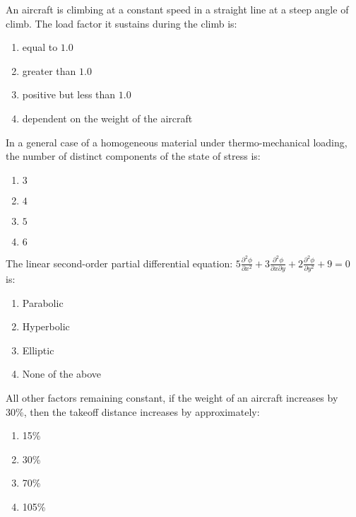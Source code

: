 \item An aircraft is climbing at a constant speed in a straight line at a steep angle of climb. The load factor it sustains during the climb is:

\begin{multicols}{2}
\begin{enumerate}
    \item equal to $1.0$
    \item greater than $1.0$
    \item positive but less than $1.0$
    \item dependent on the weight of the aircraft
\end{enumerate}
\end{multicols}

\item In a general case of a homogeneous material under thermo-mechanical loading, the number of distinct components of the state of stress is:
\begin{multicols}{4}
\begin{enumerate}
    \item $3$ 
    \item $4$ 
    \item $5$ 
    \item $6$
\end{enumerate}
\end{multicols}

\item The linear second-order partial differential equation:
$5 \frac{\partial^2 \phi}{\partial x^2} + 3 \frac{\partial^2 \phi}{\partial x \partial y} + 2 \frac{\partial^2 \phi}{\partial y^2} + 9 = 0$ is:
\begin{multicols}{2}
\begin{enumerate}
    \item Parabolic
    \item Hyperbolic
    \item Elliptic
    \item None of the above
\end{enumerate}
\end{multicols}

\item All other factors remaining constant, if the weight of an aircraft increases by 30\%, then the takeoff distance increases by approximately:
\begin{multicols}{4}
\begin{enumerate}
    \item 15\%
    \item 30\%
    \item 70\% 
    \item 105\%
\end{enumerate}
\end{multicols}

